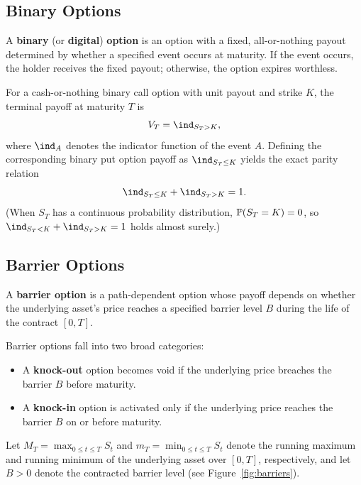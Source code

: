 \subsection*{Binary Options}

\begin{definition}
\label{def:binary_option}
A \textbf{binary} (or \textbf{digital}) \textbf{option} is an option with a fixed, all-or-nothing payout determined by whether a specified event occurs at maturity. If the event occurs, the holder receives the fixed payout; otherwise, the option expires worthless.
\end{definition}

For a cash-or-nothing binary call option with unit payout and strike $K$, the terminal payoff at maturity $T$ is
\[
    V_T = \ind_{S_T > K},
\]
where $\ind_{A}$ denotes the indicator function of the event $A$. Defining the corresponding binary put option payoff as $\ind_{S_T \le K}$ yields the exact parity relation
\[
    \ind_{S_T \le K} + \ind_{S_T > K} = 1.
\]
(When $S_T$ has a continuous probability distribution, $\mathbb{P}(S_T = K) = 0$, so $\ind_{S_T < K} + \ind_{S_T > K} = 1$ holds almost surely.)

\subsection*{Barrier Options}

\begin{definition}
\label{def:barrier_option}
A \textbf{barrier option} is a path-dependent option whose payoff depends on whether the underlying asset's price reaches a specified barrier level $B$ during the life of the contract $[0, T]$.
\end{definition}

Barrier options fall into two broad categories:
\begin{itemize}
    \item A \textbf{knock-out} option becomes void if the underlying price breaches the barrier $B$ before maturity.
    \item A \textbf{knock-in} option is activated only if the underlying price reaches the barrier $B$ on or before maturity.
\end{itemize}

Let $M_T = \max_{0 \le t \le T} S_t$ and $m_T = \min_{0 \le t \le T} S_t$ denote the running maximum and running minimum of the underlying asset over $[0, T]$, respectively, and let $B > 0$ denote the contracted barrier level (see Figure~\ref{fig:barriers}).

